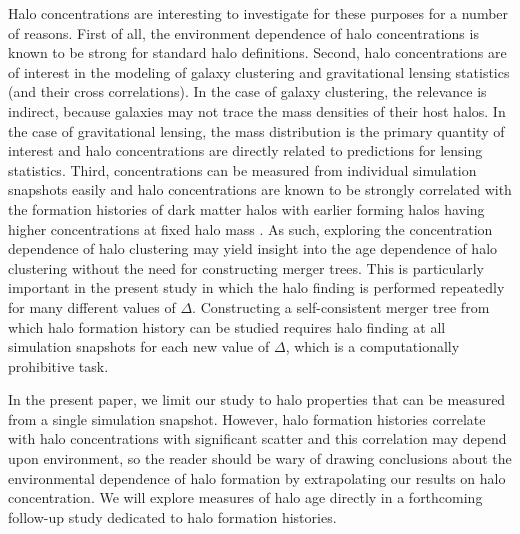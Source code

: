 \documentclass[usenatbib]{mnras}
\begin{document}
Halo concentrations are interesting to investigate for these purposes for a number of reasons. 
First of all, the environment dependence of halo concentrations is known to be strong for 
standard halo definitions. Second, halo concentrations are of interest in the modeling of 
galaxy clustering and gravitational lensing statistics (and their cross correlations). 
In the case of galaxy clustering, the relevance is indirect, because galaxies may 
not trace the mass densities of their host halos. In the case 
of gravitational lensing, the mass distribution is the primary quantity of interest and halo concentrations are 
directly related to predictions for lensing statistics. Third, concentrations can be measured from 
individual simulation snapshots easily and halo concentrations are known to be strongly correlated with 
the formation histories of dark matter halos with earlier forming halos having higher concentrations at 
fixed halo mass \citep{wechsler_etal02, zhao_etal03, wechsler_etal06, zhao_etal09}. 
As such, exploring the concentration dependence of halo
clustering may yield insight into the age dependence of halo clustering without the need for constructing merger
trees. This is particularly important in the present study in which the halo finding is performed repeatedly for many 
different values of $\Delta$. Constructing a self-consistent merger tree from which halo formation history can be 
studied requires halo finding at all simulation snapshots for each new value of $\Delta$, which is a computationally 
prohibitive task. 

In the present paper, we limit our study to halo properties that can be measured from a single simulation 
snapshot. However, halo formation histories correlate with halo concentrations with significant scatter and this correlation may 
depend upon environment, so the reader should be wary of drawing conclusions about the environmental dependence of 
halo formation by extrapolating our results on halo concentration. 
We will explore measures of halo age directly in a forthcoming follow-up study dedicated to halo 
formation histories.
\end{document}
